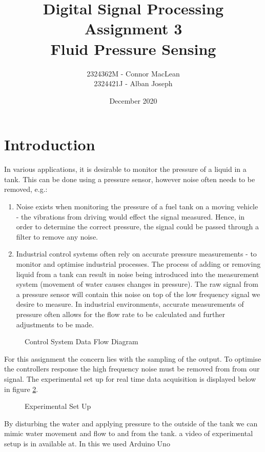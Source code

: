 \documentclass{article}
\title{Digital Signal Processing\\Assignment 3\\Fluid Pressure Sensing}
\author{2324362M - Connor MacLean\\2324421J - Alban Joseph}
\date{December 2020}
\begin{document}
\maketitle
\section{Introduction}
In various applications, it is desirable to monitor the pressure of a liquid in a tank. This can be done using a pressure sensor, however noise often needs to be removed, e.g.:
\begin{enumerate}
  \item Noise exists when monitoring the pressure of a fuel tank on a moving vehicle - the vibrations from driving would effect the signal measured. Hence, in order to determine the correct pressure, the signal could be passed through a filter to remove any noise.
  \item Industrial control systems often rely on accurate pressure measurements - to monitor and optimise industrial processes. The process of adding or removing liquid from a tank can result in noise being introduced into the measurement system (movement of water causes changes in pressure). The raw signal from a pressure sensor will contain this noise on top of the low frequency signal we desire to measure. In industrial environments, accurate measurements of pressure often allows for the flow rate to be calculated and further adjustments to be made.
\end{enumerate}
\newline
\begin{figure}[H]
    \centering
    
    \caption{Control System Data Flow Diagram}
    \label{fig:universe}
\end{figure}
\newline 
For this assignment the concern lies with the sampling of the output. To optimise the controllers response the high frequency noise must be removed from from our signal. The experimental set up for real time data acquisition is displayed below in figure \ref{fig:setUp}.
\begin{figure}[H]
  \centering
  
  \caption{Experimental Set Up}
  \label{fig:setUp}
\end{figure}
By disturbing the water and applying pressure to the outside of the tank we can mimic water movement and flow to and from the tank. a video of experimental setup is in available at. In this we used Arduino Uno
 
\end{document}
